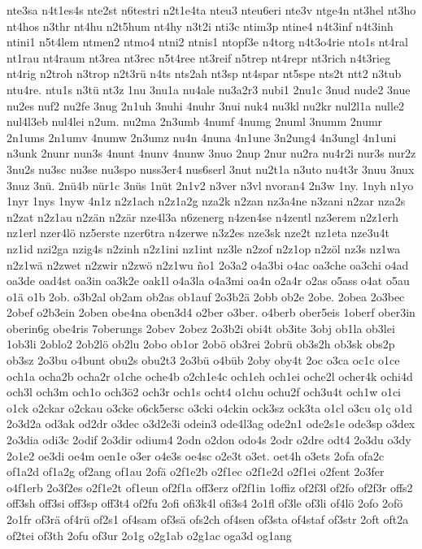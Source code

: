 {nte3sa
n4t1es4s
nte2st
n6testri
n2t1e4ta
nteu3
nteu6eri
nte3v
ntge4n
nt3hel
nt3ho
nt4hos
n3thr
nt4hu
n2t5hum
nt4hy
n3t2i
nti3c
ntim3p
ntine4
n4t3inf
n4t3inh
ntini1
n5t4lem
ntmen2
ntmo4
ntni2
ntnis1
ntopf3e
n4torg
n4t3o4rie
nto1s
nt4ral
nt1rau
nt4raum
nt3rea
nt3rec
n5t4ree
nt3reif
n5trep
nt4repr
nt3rich
n4t3rieg
nt4rig
n2troh
n3trop
n2t3rü
n4ts
nts2ah
nt3sp
nt4spar
nt5spe
nts2t
ntt2
n3tub
ntu4re.
ntu1s
n3tü
nt3z
1nu
3nu1a
nu4ale
nu3a2r3
nubi1
2nu1c
3nud
nude2
3nue
nu2es
nuf2
nu2fe
3nug
2n1uh
3nuhi
4nuhr
3nui
nuk4
nu3kl
nu2kr
nul2l1a
nulle2
nul4l3eb
nul4lei
n2um.
nu2ma
2n3umb
4numf
4numg
2numl
3numm
2numr
2n1ums
2n1umv
4numw
2n3umz
nu4n
4nuna
4n1une
3n2ung4
4n3ungl
4n1uni
n3unk
2nunr
nun3s
4nunt
4nunv
4nunw
3nuo
2nup
2nur
nu2ra
nu4r2i
nur3s
nur2z
3nu2s
nu3sc
nu3se
nu3spo
nuss3er4
nus6serl
3nut
nu2t1a
n3uto
nu4t3r
3nuu
3nux
3nuz
3nü.
2nü4b
nür1c
3nüs
1nüt
2n1v2
n3ver
n3vl
nvoran4
2n3w
1ny.
1nyh
n1yo
1nyr
1nys
1nyw
4n1z
n2z1ach
n2z1a2g
nza2k
n2zan
nz3a4ne
n3zani
n2zar
nza2s
n2zat
n2z1au
n2zän
n2zär
nze4l3a
n6zenerg
n4zen4se
n4zentl
nz3erem
n2z1erh
nz1erl
nzer4lö
nz5erste
nzer6tra
n4zerwe
n3z2es
nze3sk
nze2t
nz1eta
nze3u4t
nz1id
nzi2ga
nzig4s
n2zinh
n2z1ini
nz1int
nz3le
n2zof
n2z1op
n2zöl
nz3s
nz1wa
n2z1wä
n2zwet
n2zwir
n2zwö
n2z1wu
ño1
2o3a2
o4a3bi
o4ac
oa3che
oa3chi
o4ad
oa3de
oad4st
oa3in
oa3k2e
oak1l
o4a3la
o4a3mi
oa4n
o2a4r
o2as
o5ass
o4at
o5au
o1ä
o1b
2ob.
o3b2al
ob2am
ob2as
ob1auf
2o3b2ä
2obb
ob2e
2obe.
2obea
2o3bec
2obef
o2b3ein
2oben
obe4na
oben3d4
o2ber
o3ber.
o4berb
ober5eis
1oberf
ober3in
oberin6g
obe4ris
7oberungs
2obev
2obez
2o3b2i
obi4t
ob3ite
3obj
ob1la
ob3lei
1ob3li
2oblo2
2ob2lö
ob2lu
2obo
ob1or
2obö
ob3rei
2obrü
ob3s2h
ob3sk
obs2p
ob3sz
2o3bu
o4bunt
obu2s
obu2t3
2o3bü
o4büb
2oby
oby4t
2oc
o3ca
oc1c
o1ce
och1a
ocha2b
ocha2r
o1che
oche4b
o2ch1e4c
och1eh
och1ei
oche2l
ocher4k
ochi4d
och3l
och3m
och1o
och3ö2
och3r
och1s
ocht4
o1chu
ochu2f
och3u4t
och1w
o1ci
o1ck
o2ckar
o2ckau
o3cke
o6ck5ersc
o3cki
o4ckin
ock3sz
ock3ta
o1cl
o3cu
o1ç
o1d
2o3d2a
od3ak
od2dr
o3dec
o3d2e3i
odein3
ode4l3ag
ode2n1
ode2s1e
ode3sp
o3dex
2o3dia
odi3c
2odif
2o3dir
odium4
2odn
o2don
odo4s
2odr
o2dre
odt4
2o3du
o3dy
2o1e2
oe3di
oe4m
oen1e
o3er
o4e3s
oe4sc
o2e3t
o3et.
oet4h
o3ets
2ofa
ofa2c
of1a2d
of1a2g
of2ang
of1au
2ofä
o2f1e2b
o2f1ec
o2f1e2d
o2f1ei
o2fent
2o3fer
o4f1erb
2o3f2es
o2f1e2t
of1eun
of2f1a
off3erz
of2f1in
1offiz
of2f3l
of2fo
of2f3r
offs2
off3sh
off3si
off3sp
off3t4
of2fu
2ofi
ofi3k4l
ofi3s4
2o1fl
of3le
of3li
of4lö
2ofo
2ofö
2o1fr
of3rä
of4rü
of2s1
of4sam
of3sä
ofs2ch
of4sen
of3sta
of4staf
of3str
2oft
oft2a
of2tei
of3th
2ofu
of3ur
2o1g
o2g1ab
o2g1ac
oga3d
og1ang
}
